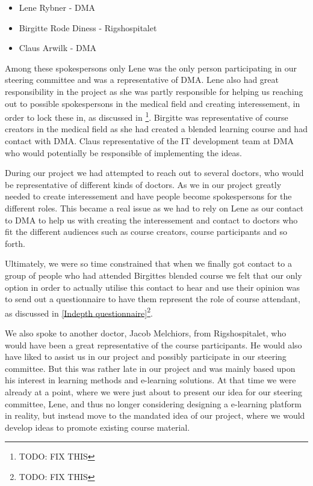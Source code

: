 \begin{itemize}
\item Lene Rybner - DMA
\item Birgitte Rode Diness - Rigshospitalet
\item Claus Arwilk - DMA
\end{itemize}


Among these spokespersons only Lene was the only person participating in our steering committee and was a representative of DMA. Lene also had great responsibility in the project as she was partly responsible for helping us reaching out to possible spokespersons in the medical field and creating interessement, in order to lock these in, as discussed in \cite{callon}\footnote{TODO: FIX THIS}. Birgitte was representative of course creators in the medical field as she had created a blended learning course and had contact with DMA. Claus representative of the IT development team at DMA who would potentially be responsible of implementing the ideas.

During our project we had attempted to reach out to several doctors, who would be representative of different kinds of doctors. As we in our project greatly needed to create interessement and have people become spokespersons for the different roles. This became a real issue as we had to rely on Lene as our contact to DMA to help us with creating the interessement and contact to doctors who fit the different audiences such as course creators, course participants and so forth.

Ultimately, we were so time constrained that when we finally got contact to a group of people who had attended Birgittes blended course we felt that our only option in order to actually utilise this contact to hear and use their opinion was to send out a questionnaire to have them represent the role of course attendant, as discussed in \ref{Indepth questionnaire}\footnote{TODO: FIX THIS}. 

We also spoke to another doctor, Jacob Melchiors, from Rigshospitalet, who would have been a great representative of the course participants. He would also have liked to assist us in our project and possibly participate in our steering committee. But this was rather late in our project and was mainly based upon his interest in learning methods and e-learning solutions. At that time we were already at a point, where we were just about to present our idea for our steering committee, Lene, and thus no longer considering designing a e-learning platform in reality, but instead move to the mandated idea of our project, where we would develop ideas to promote existing course material.

